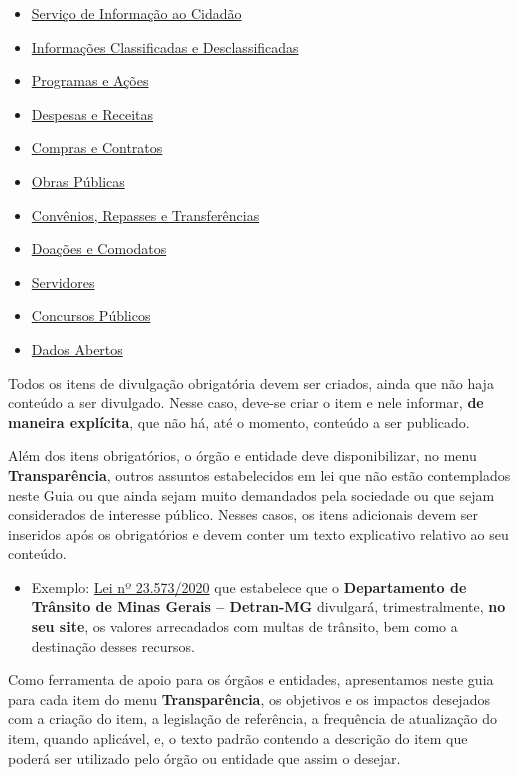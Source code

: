 \documentclass[]{book}
\providecommand{\tightlist}{%
  \setlength{\itemsep}{0pt}\setlength{\parskip}{0pt}}
\begin{document}
\begin{itemize}
\tightlist
\item
  \href{servico-informacao.html}{Serviço de Informação ao Cidadão}
\item
  \href{informacoes-classificadas.html}{Informações Classificadas e Desclassificadas}
\item
  \href{programas-acoes.html}{Programas e Ações}
\item
  \href{despesas-receitas.html}{Despesas e Receitas}
\item
  \href{compras-contratos.html}{Compras e Contratos}
\item
  \href{obras-publicas.html}{Obras Públicas}
\item
  \href{convenios-repasses.html}{Convênios, Repasses e Transferências}
\item
  \href{doacoes.html}{Doações e Comodatos}
\item
  \href{servidores.html}{Servidores}
\item
  \href{concursos-publicos.html}{Concursos Públicos}
\item
  \href{dados-abertos.html}{Dados Abertos}
\end{itemize}

Todos os itens de divulgação obrigatória devem ser criados, ainda que não haja conteúdo a ser divulgado. Nesse caso, deve-se criar o item e nele informar, \textbf{de maneira explícita}, que não há, até o momento, conteúdo a ser publicado.

Além dos itens obrigatórios, o órgão e entidade deve disponibilizar, no menu \textbf{Transparência}, outros assuntos estabelecidos em lei que não estão contemplados neste Guia ou que ainda sejam muito demandados pela sociedade ou que sejam considerados de interesse público. Nesses casos, os itens adicionais devem ser inseridos após os obrigatórios e devem conter um texto explicativo relativo ao seu conteúdo.

\begin{itemize}
\tightlist
\item
  Exemplo: \href{https://www.almg.gov.br/consulte/legislacao/completa/completa.html?tipo=LEI\&num=23573\&comp=\&ano=2020}{Lei nº 23.573/2020} que estabelece que o \textbf{Departamento de Trânsito de Minas Gerais -- Detran-MG} divulgará, trimestralmente, \textbf{no seu site}, os valores arrecadados com multas de trânsito, bem como a destinação desses recursos.
\end{itemize}

Como ferramenta de apoio para os órgãos e entidades, apresentamos neste guia para cada item do menu \textbf{Transparência}, os objetivos e os impactos desejados com a criação do item, a legislação de referência, a frequência de atualização do item, quando aplicável, e, o texto padrão contendo a descrição do item que poderá ser utilizado pelo órgão ou entidade que assim o desejar.
\end{document}
